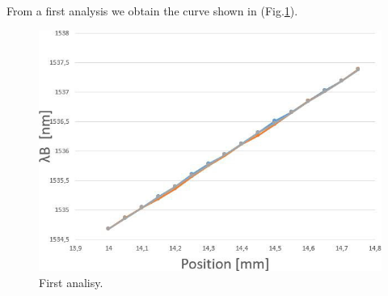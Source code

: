 From a first analysis we obtain the curve shown in (Fig.\ref{fig:firstAnalisy}).
\begin{figure}[h]
    \centering
    \includegraphics[scale=0.7]{img/firstAnalisy.jpg}
    \caption{First analisy.}
    \label{fig:firstAnalisy}
\end{figure}


